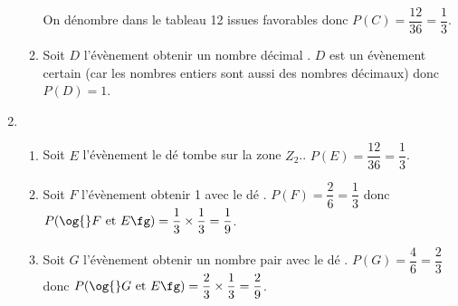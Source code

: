 \begin{enumerate}
\begin{enumerate}
	\medskip On dénombre dans le tableau 12 issues favorables donc $P(C)=\dfrac{12}{36}=\dfrac{1}{3}$.
	
	\item Soit $D$ l'évènement \og{} obtenir un nombre décimal \fg{}. $D$ est un évènement certain (car les nombres entiers sont aussi des nombres décimaux) donc $P(D)=1$.
	\end{enumerate}
	
	\item 
	\begin{enumerate}
		\item Soit $E$ l'évènement \og{} le dé tombe sur la zone $Z_2$.\fg{}. $P(E)=\dfrac{12}{36}=\dfrac{1}{3}$.
		
		\item Soit $F$ l'évènement \og{} obtenir 1 avec le dé \fg{}. $P(F)=\dfrac{2}{6}=\dfrac{1}{3}$ donc $P(\og{} F~\text{et }E\fg)=\dfrac{1}{3}\times\dfrac{1}{3}=\dfrac{1}{9}$.
		
		\item Soit $G$ l'évènement \og{} obtenir un nombre pair avec le dé \fg{}. $P(G)=\dfrac{4}{6}=\dfrac{2}{3}$ donc $P(\og{} G~\text{et }E\fg)=\dfrac{2}{3}\times\dfrac{1}{3}=\dfrac{2}{9}$.
		
		 
	\end{enumerate}

\end{enumerate}